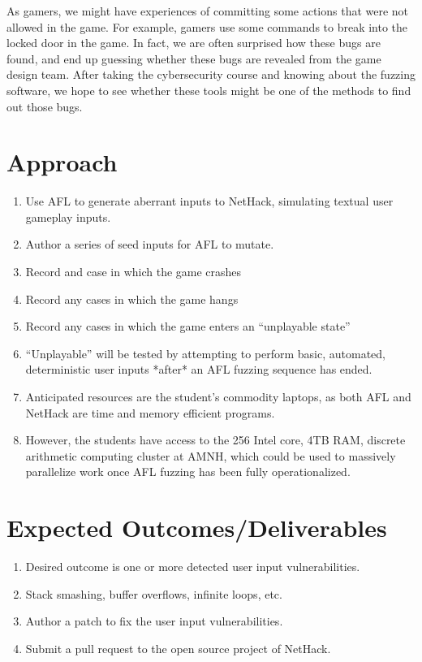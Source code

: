 \documentclass[12pt]{diazessay}
\begin{document}
As gamers, we might have experiences of committing some actions that were not allowed in the game.
For example, gamers use some commands to break into the locked door in the game.
In fact, we are often surprised how these bugs are found, and end up guessing whether these bugs are revealed from the game design team.
After taking the cybersecurity course and knowing about the fuzzing software, we hope to see whether these tools might be one of the methods to find out those bugs.


\section*{Approach}

\begin{enumerate}
  \item Use AFL to generate aberrant inputs to NetHack, simulating textual user gameplay inputs.
  \item Author a series of seed inputs for AFL to mutate.
  \item Record and case in which the game crashes
  \item Record any cases in which the game hangs
  \item Record any cases in which the game enters an “unplayable state”
  \item “Unplayable” will be tested by attempting to perform basic, automated, deterministic user inputs *after* an AFL fuzzing sequence has ended.
  \item Anticipated resources are the student’s commodity laptops, as both AFL and NetHack are time and memory efficient programs.
  \item However, the students have access to the 256 Intel core, 4TB RAM, discrete arithmetic computing cluster at AMNH, which could be used to massively parallelize work once AFL fuzzing has been fully operationalized.
\end{enumerate}


\section*{Expected Outcomes/Deliverables}

\begin{enumerate}
  \item Desired outcome is one or more detected user input vulnerabilities.
  \item Stack smashing, buffer overflows, infinite loops, etc.
  \item Author a patch to fix the user input vulnerabilities.
  \item Submit a pull request to the open source project of NetHack.
\end{enumerate}
\end{document}
